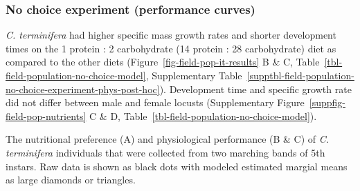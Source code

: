 \documentclass[
]{article}
\begin{document}
\subsubsection{No choice experiment (performance
curves)}\label{no-choice-experiment-performance-curves}

\emph{C. terminifera} had higher specific mass growth rates and shorter
development times on the 1 protein : 2 carbohydrate (14 protein : 28
carbohydrate) diet as compared to the other diets
(Figure~\ref{fig-field-pop-it-results} B \& C,
Table~\ref{tbl-field-population-no-choice-model},
Supplementary Table~\ref{supptbl-field-population-no-choice-experiment-phys-post-hoc}).
Development time and specific growth rate did not differ between male
and female locusts
(Supplementary Figure~\ref{suppfig-field-pop-nutrients} C \& D,
Table~\ref{tbl-field-population-no-choice-model}).

\begin{fig}


\caption{\label{fig-field-pop-it-results}The nutritional preference (A)
and physiological performance (B \& C) of \emph{C. terminifera}
individuals that were collected from two marching bands of 5th instars.
Raw data is shown as black dots with modeled estimated margial means as
large diamonds or triangles.}

\end{fig}%
\end{document}
